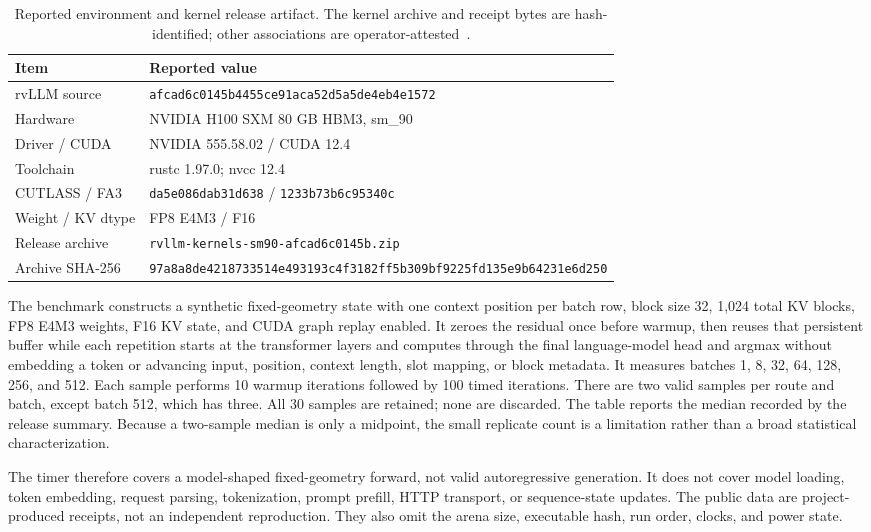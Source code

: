 \begin{table}[htbp]
  \centering
  \small
  \begin{tabularx}{\textwidth}{@{}lX@{}}
    \toprule
    Item & Reported value \\
    \midrule
    rvLLM source & \texttt{afcad6c0145b4455ce91aca52d5a5de4eb4e1572} \\
    Hardware & NVIDIA H100 SXM 80 GB HBM3, sm\_90 \\
    Driver / CUDA & NVIDIA 555.58.02 / CUDA 12.4 \\
    Toolchain & rustc 1.97.0; nvcc 12.4 \\
    CUTLASS / FA3 & \texttt{da5e086dab31d638} / \texttt{1233b73b6c95340c} \\
    Weight / KV dtype & FP8 E4M3 / F16 \\
    Release archive & \texttt{rvllm-kernels-sm90-afcad6c0145b.zip} \\
    Archive SHA-256 & \scriptsize\texttt{97a8a8de4218733514e493193c4f3182ff5b309bf9225fd135e9b64231e6d250} \\
    \bottomrule
  \end{tabularx}
  \caption{Reported environment and kernel release artifact. The kernel
  archive and receipt bytes are hash-identified; other associations are
  operator-attested~\citep{rvllm2026receipts}.}
  \label{tab:environment}
\end{table}

The benchmark constructs a synthetic fixed-geometry state with one context
position per batch row, block size 32, 1,024 total KV blocks, FP8 E4M3 weights,
F16 KV state, and CUDA graph replay enabled. It zeroes the residual once before
warmup, then reuses that persistent buffer while each repetition starts at the
transformer layers and computes through the final
language-model head and argmax without embedding a token or advancing input,
position, context length, slot mapping, or block metadata. It measures batches
1, 8, 32, 64, 128, 256, and 512. Each sample performs 10 warmup iterations followed by 100 timed
iterations. There are two valid samples per route and batch, except batch 512,
which has three. All 30 samples are retained; none are discarded. The table
reports the median recorded by the release summary. Because a two-sample
median is only a midpoint, the small replicate count is a limitation rather
than a broad statistical characterization.

The timer therefore covers a model-shaped fixed-geometry forward, not valid
autoregressive generation. It does not cover model loading, token embedding,
request parsing, tokenization, prompt prefill, HTTP transport, or sequence-state
updates. The public data are project-produced receipts, not an independent
reproduction. They also omit the arena size, executable hash, run order, clocks,
and power state.

